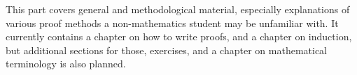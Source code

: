 \documentclass[../../include/open-logic-part]{subfiles}
\begin{document}

\begin{editorial}
  This part covers general and methodological material, especially
  explanations of various proof methods a non-mathematics student may
  be unfamiliar with. It currently contains a chapter on how to write
  proofs, and a chapter on induction, but additional sections for
  those, exercises, and a chapter on mathematical terminology is also
  planned.
\end{editorial}



\OLEndPartHook
\end{document}
